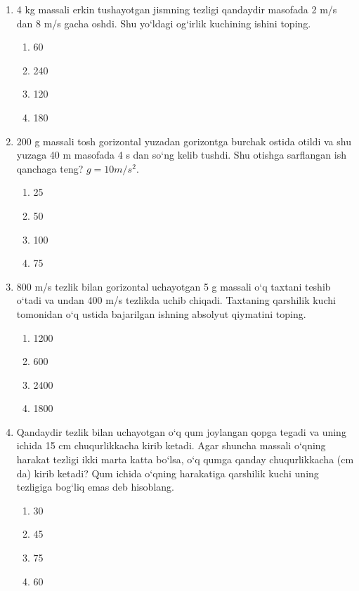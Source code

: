 \begin{enumerate}
\item 4 kg massali erkin tushayotgan jismning tezligi qandaydir masofada 2 m/s dan 8 m/s gacha oshdi. Shu yo‘ldagi og‘irlik kuchining ishini toping.
\begin{enumerate}[label=\Alph*)]
\item 60
\item 240
\item 120
\item 180
\end{enumerate}

\item 200 g massali tosh gorizontal yuzadan gorizontga burchak ostida otildi va shu yuzaga 40 m masofada 4 s dan so‘ng kelib tushdi. Shu otishga sarflangan ish qanchaga teng? $g = 10 m/s^2$.
\begin{enumerate}[label=\Alph*)]
\item 25
\item 50
\item 100
\item 75
\end{enumerate}

\item 800 m/s tezlik bilan gorizontal uchayotgan 5 g massali o‘q taxtani teshib o‘tadi va undan 400 m/s tezlikda uchib chiqadi. Taxtaning qarshilik kuchi tomonidan o‘q ustida bajarilgan ishning absolyut qiymatini toping.
\begin{enumerate}[label=\Alph*)]
\item 1200
\item 600
\item 2400
\item 1800
\end{enumerate}

\item Qandaydir tezlik bilan uchayotgan o‘q qum joylangan qopga tegadi va uning ichida 15 cm chuqurlikkacha kirib ketadi. Agar shuncha massali o‘qning harakat tezligi ikki marta katta bo‘lsa, o‘q qumga qanday chuqurlikkacha (cm da) kirib ketadi? Qum ichida o‘qning harakatiga qarshilik kuchi uning tezligiga bog‘liq emas deb hisoblang.
\begin{enumerate}[label=\Alph*)]
\item 30
\item 45
\item 75
\item 60
\end{enumerate}






\end{enumerate}

